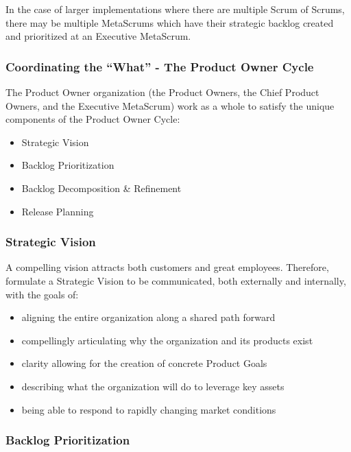 \documentclass[12pt,a4paper,parskip=full]{scrartcl}
\begin{document}
In the case of larger implementations where there are multiple Scrum of
Scrums, there may be multiple MetaScrums which have their strategic
backlog created and prioritized at an Executive MetaScrum.

\subsubsection{Coordinating the ``What'' - The Product Owner
Cycle}\label{coordinating-the-what}

The Product Owner organization (the Product Owners, the Chief Product
Owners, and the Executive MetaScrum) work as a whole to satisfy the
unique components of the Product Owner Cycle:

\begin{itemize}
\itemsep1pt\parskip0pt
\item
  Strategic Vision
\item
  Backlog Prioritization
\item
  Backlog Decomposition \& Refinement
\item
  Release Planning
\end{itemize}

\subsubsection{Strategic Vision}\label{strategic-vision}

A compelling vision attracts both customers and great employees.
Therefore, formulate a Strategic Vision to be communicated, both
externally and internally, with the goals of:

\begin{itemize}
\itemsep1pt\parskip0pt
\item
  aligning the entire organization along a shared path forward
\item
  compellingly articulating why the organization and its products exist
\item
 clarity allowing for the creation of concrete Product Goals
\item
describing what the organization will do to leverage key assets
\item
being able to respond to rapidly changing market conditions
\end{itemize}

\subsubsection{Backlog Prioritization}\label{backlog-prioritization}
\end{document}
